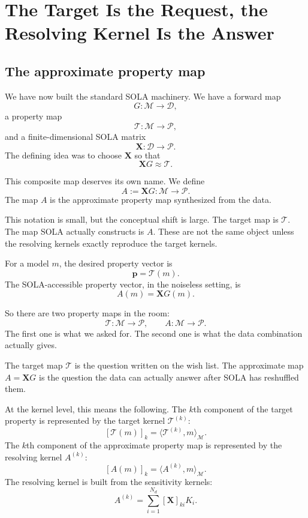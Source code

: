 \documentclass[11pt,openany]{book}
\theoremstyle{definition}
\theoremstyle{remark}
\newcommand{\M}{\mathcal M}
\newcommand{\D}{\mathcal D}
\newcommand{\Pspace}{\mathcal P}
\newcommand{\Tau}{\mathcal{T}}
\begin{document}
\chapter{The Target Is the Request, the Resolving Kernel Is the Answer}

\section{The approximate property map}

We have now built the standard SOLA machinery. We have a forward map
\[
  G:\M\to\D,
\]
a property map
\[
  \Tau:\M\to\Pspace,
\]
and a finite-dimensional SOLA matrix
\[
  \mathbf X:\D\to\Pspace.
\]
The defining idea was to choose \(\mathbf X\) so that
\[
  \mathbf XG\approx \Tau.
\]

This composite map deserves its own name. We define
\[
  A:=\mathbf XG:\M\to\Pspace.
\]
The map \(A\) is the approximate property map synthesized from the data.

This notation is small, but the conceptual shift is large. The target map is \(\Tau\). The map
SOLA actually constructs is \(A\). These are not the same object unless the resolving kernels
exactly reproduce the target kernels.

For a model \(m\), the desired property vector is
\[
  \mathbf p=\Tau(m).
\]
The SOLA-accessible property vector, in the noiseless setting, is
\[
  A(m)=\mathbf XG(m).
\]

So there are two property maps in the room:
\[
  \Tau:\M\to\Pspace,
  \qquad
  A:\M\to\Pspace.
\]
The first one is what we asked for. The second one is what the data combination actually gives.

\begin{intuitionbox}
The target map \(\Tau\) is the question written on the wish list. The approximate map
\(A=\mathbf XG\) is the question the data can actually answer after SOLA has reshuffled them.
\end{intuitionbox}

At the kernel level, this means the following. The \(k\)th component of the target property is
represented by the target kernel \(\mathcal T^{(k)}\):
\[
  [\Tau(m)]_k
  =
  \langle \mathcal T^{(k)},m\rangle_{\M}.
\]
The \(k\)th component of the approximate property map is represented by the resolving kernel
\(A^{(k)}\):
\[
  [A(m)]_k
  =
  \langle A^{(k)},m\rangle_{\M}.
\]
The resolving kernel is built from the sensitivity kernels:
\[
  A^{(k)}
  =
  \sum_{i=1}^{N_d}[\mathbf X]_{ki}K_i.
\]
\end{document}
